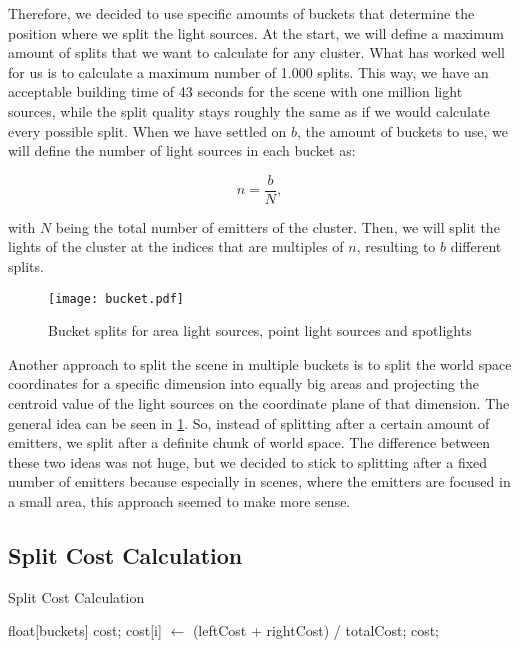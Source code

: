 Therefore, we decided to use specific amounts of buckets that determine the position where we split the light sources. At the start, we will define a maximum amount of splits that we want to calculate for any cluster. What has worked well for us is to calculate a maximum number of 1.000 splits. This way, we have an acceptable building time of 43 seconds for the scene with one million light sources, while the split quality stays roughly the same as if we would calculate every possible split. When we have settled on $b$, the amount of buckets to use, we will define the number of light sources in each bucket as:

\begin{equation}
n = \frac{b}{N},
\end{equation}

with $N$ being the total number of emitters of the cluster. Then, we will split the lights of the cluster at the indices that are multiples of $n$, resulting to $b$ different splits. 

\begin{figure}
	\begin{center}
		\texttt{[image: bucket.pdf]}
		\caption{Bucket splits for area light sources, point light sources and spotlights}
		\label{fig:bucket}
	\end{center}
\end{figure}

Another approach to split the scene in multiple buckets is to split the world space coordinates for a specific dimension into equally big areas and projecting the centroid value of the light sources on the coordinate plane of that dimension. The general idea can be seen in \ref{fig:bucket}. So, instead of splitting after a certain amount of emitters, we split after a definite chunk of world space. The difference between these two ideas was not huge, but we decided to stick to splitting after a fixed number of emitters because especially in scenes, where the emitters are focused in a small area, this approach seemed to make more sense.

\subsection{Split Cost Calculation}
\label{subs:splitcost}

\begin{algorithm}
	\caption{Split Cost Calculation}
	\label{alg:splitcostcalculation}
	\begin{algorithmic}[1] %
		\State float[buckets] cost;
		\State <calculate axis, thetas, AABB and energy for the left part>
		\State <calculate axis, thetas, AABB and energy for the right part>
		\State <calculate leftCost, rightCost and totalCost>
		\State cost[i] $\gets$ (leftCost + rightCost) / totalCost;
		\EndFor
\State \Return cost;
\EndProcedure
\end{algorithmic}
\end{algorithm}

